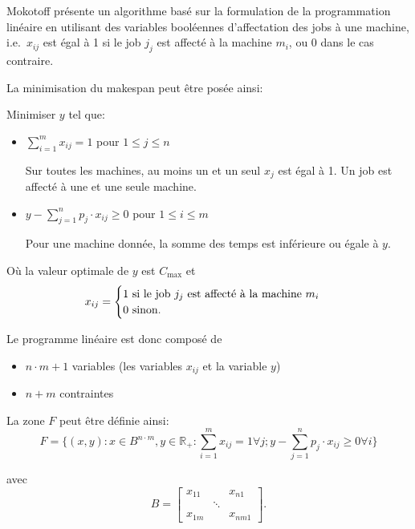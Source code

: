 \documentclass[a4paper,12pt]{report}
\theoremstyle{plain}				%
\theoremstyle{definition}				%
\newcommand{\tdi}[1]{\todo[inline]{{#1}}{}}
\newcommand{\lp}[1]{\todo[author=LP,color=yellow,inline]{#1}}
\begin{document}

Mokotoff \cite{mokoto1999scheduling} présente un algorithme basé sur
la formulation de la programmation linéaire en utilisant des
variables booléennes d'affectation des jobs à une machine, i.e.\
$x_{ij}$ est égal à 1 si le job $j_j$ est affecté à la machine $m_i$, ou
0 dans le cas contraire.

\bigskip
La minimisation du makespan peut être posée ainsi:

Minimiser $y$ tel que:

\begin{itemize}
\item $\sum_{i=1}^{m}x_{ij}=1$ \quad pour $1 \leq j \leq n$

Sur toutes les machines, au moins un et un seul $x_j$ est égal à 1.
Un job est affecté à une et une seule machine.

\item $y-\sum_{j=1}^{n}p_j \cdot x_{ij} \geq 0$ \quad pour $1 \leq i \leq m$

Pour une machine donnée, la somme des temps est inférieure ou égale à $y$.
\end{itemize}

\bigskip
Où la valeur optimale de $y$ est $C_{\max}$
et
\[
  x_{ij} =
  \begin{cases}
    1 \textnormal{ si le job $j_j$ est affecté à la machine $m_i$}\\
    0 \textnormal{ sinon.}\\
  \end{cases}
\]

Le programme linéaire est donc composé de
\begin{itemize}
\item $n \cdot m + 1$ variables (les variables $x_{ij}$ et la variable $y$)
\item $n+m$ contraintes
\end{itemize}

La zone $F$ peut être définie ainsi:
\[
  F=\{ (x,y) : x \in B^{n \cdot m}, y \in \mathbb{R_+} : \sum_{i=1}^{m} x_{ij}=1 \forall j;
y-\sum_{j=1}^{n} p_j \cdot x_{ij} \geq 0 \forall i \}
\]

avec
\[
B=\begin{bmatrix}
x_{11}& &x_{n1}\\
& \ddots & \\
x_{1m}& &x_{nm1}
\end{bmatrix}.
\]
\end{document}
